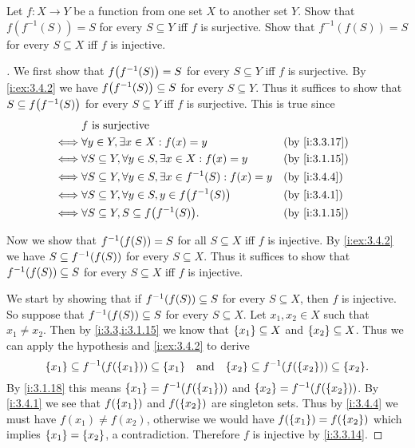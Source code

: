 \begin{ex}\label{i:ex:3.4.5}
  Let \(f : X \to Y\) be a function from one set \(X\) to another set \(Y\).
  Show that \(f(f^{-1}(S)) = S\) for every \(S \subseteq Y\) iff \(f\) is surjective.
  Show that \(f^{-1}(f(S)) = S\) for every \(S \subseteq X\) iff \(f\) is injective.
\end{ex}

\begin{proof}[]
  We first show that \(f\pa{f^{-1}(S)} = S\) for every \(S \subseteq Y\) iff \(f\) is surjective.
  By \cref{i:ex:3.4.2} we have \(f\pa{f^{-1}(S)} \subseteq S\) for every \(S \subseteq Y\).
  Thus it suffices to show that \(S \subseteq f\pa{f^{-1}(S)}\) for every \(S \subseteq Y\) iff \(f\) is surjective.
  This is true since
  \begin{align*}
         & f \text{ is surjective}                                                                       \\
    \iff & \forall y \in Y, \exists x \in X : f(x) = y                                &  & \by{i:3.3.17} \\
    \iff & \forall S \subseteq Y, \forall y \in S, \exists x \in X : f(x) = y         &  & \by{i:3.1.15} \\
    \iff & \forall S \subseteq Y, \forall y \in S, \exists x \in f^{-1}(S) : f(x) = y &  & \by{i:3.4.4}  \\
    \iff & \forall S \subseteq Y, \forall y \in S, y \in f\pa{f^{-1}(S)}              &  & \by{i:3.4.1}  \\
    \iff & \forall S \subseteq Y, S \subseteq f\pa{f^{-1}(S)}.                        &  & \by{i:3.1.15}
  \end{align*}

  Now we show that \(f^{-1}\pa{f(S)} = S\) for all \(S \subseteq X\) iff \(f\) is injective.
  By \cref{i:ex:3.4.2} we have \(S \subseteq f^{-1}\pa{f(S)}\) for every \(S \subseteq X\).
  Thus it suffices to show that \(f^{-1}\pa{f(S)} \subseteq S\) for every \(S \subseteq X\) iff \(f\) is injective.

  We start by showing that if \(f^{-1}\pa{f(S)} \subseteq S\) for every \(S \subseteq X\), then \(f\) is injective.
  So suppose that \(f^{-1}\pa{f(S)} \subseteq S\) for every \(S \subseteq X\).
  Let \(x_1, x_2 \in X\) such that \(x_1 \neq x_2\).
  Then by \cref{i:3.3,i:3.1.15} we know that \(\left\lbrace x_1\right\rbrace \subseteq X\) and \(\left\lbrace x_2\right\rbrace \subseteq X\).
  Thus we can apply the hypothesis and \cref{i:ex:3.4.2} to derive
  \[
    \set{x_1} \subseteq f^{-1}\pa{f\pa{\set{x_1}}} \subseteq \set{x_1} \quad \text{and} \quad \set{x_2} \subseteq f^{-1}\pa{f\pa{\set{x_2}}} \subseteq \set{x_2}.
  \]
  By \cref{i:3.1.18} this means \(\set{x_1} = f^{-1}\pa{f\pa{\set{x_1}}}\) and \(\set{x_2} = f^{-1}\pa{f\pa{\set{x_2}}}\).
  By \cref{i:3.4.1} we see that \(f\pa{\set{x_1}}\) and \(f\pa{\set{x_2}}\) are singleton sets.
  Thus by \cref{i:3.4.4} we must have \(f(x_1) \neq f(x_2)\), otherwise we would have \(f(\left\lbrace x_1\right\rbrace) = f(\left\lbrace x_2\right\rbrace)\) which implies \(\left\lbrace x_1\right\rbrace = \left\lbrace x_2\right\rbrace\), a contradiction.
  Therefore \(f\) is injective by \cref{i:3.3.14}.


\end{proof}
